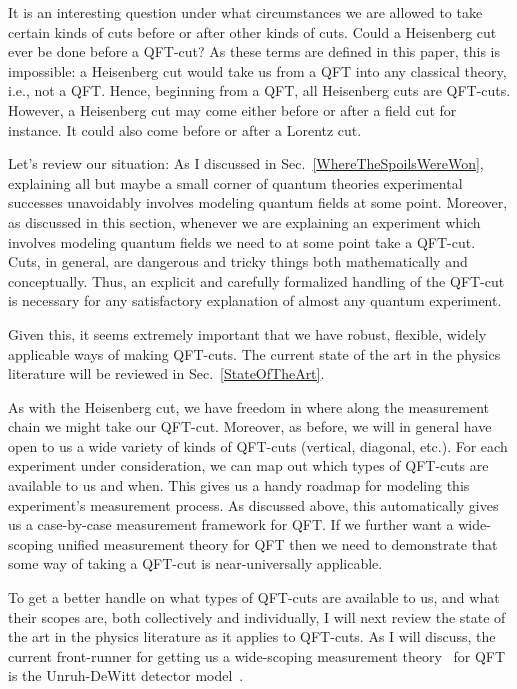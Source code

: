 \documentclass[prd,twocolumn,superscriptaddress,floatfix,amsmath,amssymb,amsfonts,nofootinbib]{revtex4-2}
\begin{document}
It is an interesting question under what circumstances we are allowed to take certain kinds of cuts before or after other kinds of cuts. Could a Heisenberg cut ever be done before a QFT-cut? As these terms are defined in this paper, this is impossible: a Heisenberg cut would take us from a QFT into any classical theory, i.e., not a QFT. Hence, beginning from a QFT, all Heisenberg cuts are QFT-cuts. However, a Heisenberg cut may come either before or after a field cut for instance. It could also come before or after a Lorentz cut. 

Let's review our situation: As I discussed in Sec.~\ref{WhereTheSpoilsWereWon}, explaining all but maybe a small corner of quantum theories experimental successes unavoidably involves modeling quantum fields at some point. Moreover, as discussed in this section, whenever we are explaining an experiment which involves modeling quantum fields we need to at some point take a QFT-cut. Cuts, in general, are dangerous and tricky things both mathematically and conceptually. Thus, an explicit and carefully formalized handling of the QFT-cut is necessary for any satisfactory explanation of almost any quantum experiment. 

Given this, it seems extremely important that we have robust, flexible, widely applicable ways of making QFT-cuts. The current state of the art in the physics literature will be reviewed in Sec.~\ref{StateOfTheArt}.

As with the Heisenberg cut, we have freedom in where along the measurement chain we might take our QFT-cut. Moreover, as before, we will in general have open to us a wide variety of kinds of QFT-cuts (vertical, diagonal, etc.). For each experiment under consideration, we can map out which types of QFT-cuts are available to us and when. This gives us a handy roadmap for modeling this experiment's measurement process. As discussed above, this automatically gives us a case-by-case measurement framework for QFT. If we further want a wide-scoping unified measurement theory for QFT then we need to demonstrate that some way of taking a QFT-cut is near-universally applicable.

To get a better handle on what types of QFT-cuts are available to us, and what their scopes are, both collectively and individually, I will next review the state of the art in the physics literature as it applies to QFT-cuts. As I will discuss, the current front-runner for getting us a wide-scoping measurement theory~\cite{pologomez2021detectorbased} for QFT is the Unruh-DeWitt detector model~\cite{Unruh1976,BLHu2007, Brown2013, Hotta2020, Zeromode,TaleOfTwo,Adam,Valentini1991, Reznik2003, Pozas-Kerstjens:2015,Menicucci, Terno2016, Cosmo, Henderson2018}.
\end{document}
